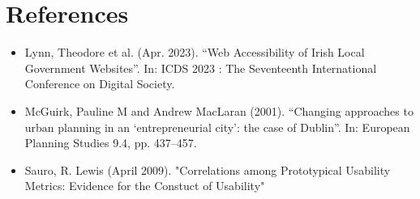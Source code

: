 \documentclass{report}
\begin{document}
\newpage
{}
\chapter*{References}
\begin{itemize}
    \item Lynn, Theodore et al. (Apr. 2023). “Web Accessibility of Irish Local Government Websites”. In: ICDS 2023 : The
          Seventeenth International Conference on Digital Society.
    \item McGuirk, Pauline M and Andrew MacLaran (2001). “Changing approaches to urban planning in an ‘entrepreneurial
          city’: the case of Dublin”. In: European Planning Studies 9.4, pp. 437–457.
    \item Sauro, R. Lewis (April 2009). "Correlations among Prototypical Usability Metrics: Evidence for the Constuct of Usability"
\end{itemize}
\listoffigures
\listoftables
\end{document}

